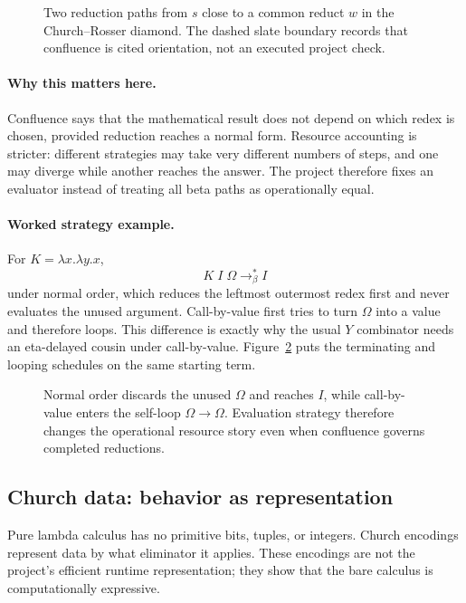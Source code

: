 \begin{figure}[ht]
\centering

\caption{Two reduction paths from $s$ close to a common reduct $w$ in the Church--Rosser diamond.  The dashed slate boundary records that confluence is cited orientation, not an executed project check.}
\label{fig:confluence}
\end{figure}

\paragraph{Why this matters here.}
Confluence says that the mathematical result does not depend on which redex
is chosen, provided reduction reaches a normal form.  Resource accounting is
stricter: different strategies may take very different numbers of steps, and
one may diverge while another reaches the answer.  The project therefore
fixes an evaluator instead of treating all beta paths as operationally equal.

\paragraph{Worked strategy example.}
For \(K=\lambda x.\lambda y.x\),
\[
 K\;I\;\Omega\longrightarrow_\beta^* I
\]
under normal order, which reduces the leftmost outermost redex first and never
evaluates the unused argument.  Call-by-value first tries to turn \(\Omega\)
into a value and therefore loops.  This difference is exactly why the usual
\(Y\) combinator needs an eta-delayed cousin under call-by-value.
Figure~\ref{fig:normal-vs-cbv} puts the terminating and looping schedules on
the same starting term.

\begin{figure}[ht]
\centering

\caption{Normal order discards the unused $\Omega$ and reaches $I$, while call-by-value enters the self-loop $\Omega\to\Omega$.  Evaluation strategy therefore changes the operational resource story even when confluence governs completed reductions.}
\label{fig:normal-vs-cbv}
\end{figure}

\subsection{Church data: behavior as representation}

Pure lambda calculus has no primitive bits, tuples, or integers.  Church
encodings represent data by what eliminator it applies.  These encodings are
not the project's efficient runtime representation; they show that the bare
calculus is computationally expressive.

